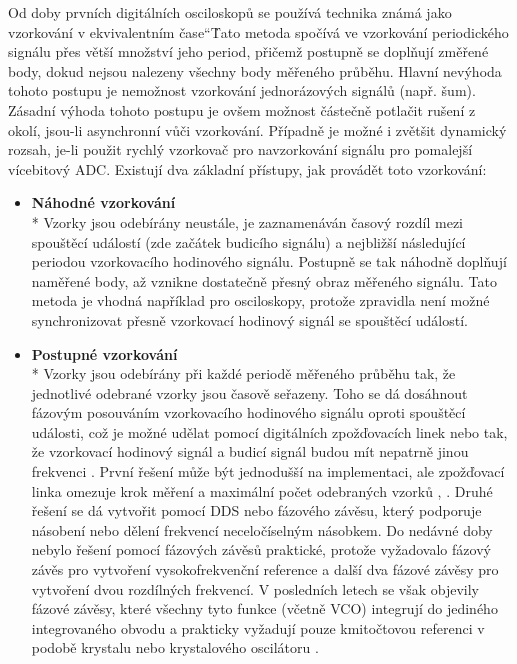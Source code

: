 Od doby prvních digitálních osciloskopů se používá technika známá jako vzorkování v \quotedblbase ekvivalentním čase\textquotedblleft\. Tato metoda spočívá ve vzorkování periodického signálu přes větší množství jeho period, přičemž postupně se doplňují změřené body, dokud nejsou nalezeny všechny body měřeného průběhu. Hlavní nevýhoda tohoto postupu je nemožnost vzorkování jednorázových signálů (např. šum). Zásadní výhoda tohoto postupu je ovšem možnost částečně potlačit rušení z okolí, jsou-li asynchronní vůči vzorkování. Případně je možné i zvětšit dynamický rozsah, je-li použit rychlý vzorkovač pro navzorkování signálu pro pomalejší vícebitový \acrshort{ADC}. Existují dva základní přístupy, jak provádět toto vzorkování:
\begin{itemize}
	\item
		\textbf{Náhodné vzorkování}\\*		
		Vzorky jsou odebírány neustále, je zaznamenáván časový rozdíl mezi spouštěcí událostí (zde začátek budicího signálu) a nejbližší následující periodou vzorkovacího hodinového signálu. Postupně se tak náhodně doplňují naměřené body, až vznikne dostatečně přesný obraz měřeného signálu. Tato metoda je vhodná například pro osciloskopy, protože zpravidla není možné synchronizovat přesně vzorkovací hodinový signál se spouštěcí událostí.
		
	\item
		\textbf{Postupné vzorkování}\\*
		Vzorky jsou odebírány při každé periodě měřeného průběhu tak, že jednotlivé odebrané vzorky jsou časově seřazeny. Toho se dá dosáhnout fázovým posouváním vzorkovacího hodinového signálu oproti spouštěcí události, což je možné udělat pomocí digitálních zpožďovacích linek nebo tak, že vzorkovací hodinový signál a budicí signál budou mít nepatrně jinou frekvenci \cite{vernierreflectometer}. První řešení může být jednodušší na implementaci, ale zpožďovací linka omezuje krok měření a maximální počet odebraných vzorků \cite{fpgadelaylinereflectometer}, \cite{simpledelaylinereflectometer}. Druhé řešení se dá vytvořit pomocí \acrshort{DDS} \cite{ddsfpgareflectometer} nebo fázového závěsu, který podporuje násobení nebo dělení frekvencí neceločíselným násobkem. Do nedávné doby nebylo řešení pomocí fázových závěsů praktické, protože vyžadovalo fázový závěs pro vytvoření vysokofrekvenční reference a další dva fázové závěsy pro vytvoření dvou rozdílných frekvencí. V posledních letech se však objevily fázové závěsy, které všechny tyto funkce (včetně \acrshort{VCO}) integrují do jediného integrovaného obvodu a prakticky vyžadují pouze kmitočtovou referenci v podobě krystalu nebo krystalového oscilátoru \cite{ADF4350datasheet} \cite{Si5351datasheet}.
\end{itemize}

